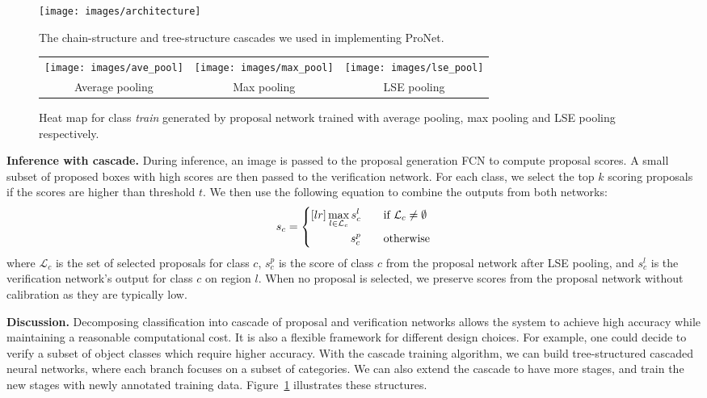 \documentclass[10pt,twocolumn,letterpaper]{article}
\begin{document}
\begin{figure}
  \centering
    \texttt{[image: images/architecture]}
  \caption{The chain-structure and tree-structure cascades we used in implementing ProNet.}
  \label{fig:chain_tree}
\end{figure}



\begin{figure*}
\centering
\begin{tabular}{ccc}
\texttt{[image: images/ave\_pool]}&\texttt{[image: images/max\_pool]}&\texttt{[image: images/lse\_pool]}\\
Average pooling & Max pooling & LSE pooling
\end{tabular}  
\caption{Heat map for class \textit{train} generated by proposal network trained with average pooling, max pooling and LSE pooling respectively.}
\label{fig:pool_compare}
\end{figure*}

\textbf{Inference with cascade.} During inference, an image is passed to the proposal generation FCN to compute proposal scores. A small subset of proposed boxes with high scores are then passed to the verification network. For each class, we select the top $k$ scoring proposals if the scores are higher than threshold $t$. We then use the following equation to combine the outputs from both networks:
\begin{equation}
s_c = \left\{
\begin{aligned}[lr]
\max_{l\in\mathcal{L}_c} s^{l}_c&\textrm{\qquad if $\mathcal{L}_c \neq \emptyset$}\\
s^{p}_c&\textrm{\qquad otherwise}
\end{aligned}
\right.
\end{equation}
where $\mathcal{L}_c$ is the set of selected proposals for class $c$, $s^p_c$ is the score of class $c$ from the proposal network after LSE pooling, and $s^l_c$ is the verification network's output for class $c$ on region $l$. When no proposal is selected, we preserve scores from the proposal network without calibration as they are typically low.

\textbf{Discussion.} Decomposing classification into cascade of proposal and verification networks allows the system to achieve high accuracy while maintaining a reasonable computational cost. It is also a flexible framework for different design choices. For example, one could decide to verify a subset of object classes which require higher accuracy. With the cascade training algorithm, we can build tree-structured cascaded neural networks, where each branch focuses on a subset of categories. We can also extend the cascade to have more stages, and train the new stages with newly annotated training data. Figure~\ref{fig:chain_tree} illustrates these structures.
\end{document}
